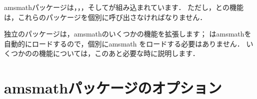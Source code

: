 \documentclass[leqno,titlepage,openany]{amsldoc}[1999/12/13]
\newcommand{\nipkg}{\textsf}
\begin{document}
\nipkg{amsmath}パッケージは，，，そしてが組み込まれています．
ただし，との機能は，これらのパッケージを個別に呼び出さなければなりません．

独立のパッケージ\cite{mt}は，\nipkg{amsmath}のいくつかの機能を拡張します；
は\nipkg{amsmath}を自動的にロードするので，個別に\nipkg{amsmath}
をロードする必要はありません．
いくつかのの機能については，このあと必要な時に説明します．



\chapter{\nipkg{amsmath}パッケージのオプション}\label{options}
\end{document}
